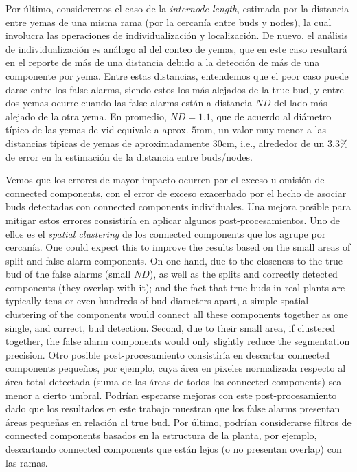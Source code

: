 \documentclass[a4paper,authoryear,review]{elsarticle}
\begin{document}
%
Por último, consideremos el caso de la \emph{internode length}, estimada por la distancia entre yemas de una misma rama (por la cercanía entre buds y nodes), la cual involucra las operaciones de individualización y localización. De nuevo, el análisis de individualización es análogo al del conteo de yemas, que en este caso resultará en el reporte de más de una distancia debido a la detección de más de una componente por yema. Entre estas distancias, entendemos que el peor caso puede darse entre los false alarms, siendo estos los más alejados de la true bud, y entre dos yemas ocurre cuando las false alarms están a distancia $ND$ del lado más alejado de la otra yema. En promedio, $ND = 1.1$, que de acuerdo al diámetro típico de las yemas de vid equivale a aprox. $5$mm, un valor muy menor a las distancias típicas de yemas de aproximadamente $30$cm, i.e., alrededor de un $3.3\%$ de error en la estimación de la distancia entre buds/nodes. 
%
%


Vemos que los errores de mayor impacto ocurren por el exceso u omisión de connected components, con el error de exceso exacerbado por el hecho de asociar buds detectadas con connected components individuales. 
%
Una mejora posible para mitigar estos errores consistiría en aplicar algunos post-procesamientos. 
%
Uno de ellos es el \emph{spatial clustering} de los connected components que los agrupe por cercanía. One could expect this to improve the results based on the small areas of split and false alarm components. On one hand, due to the closeness to the true bud of the false alarms (small $ND$), as well as the splits and  correctly detected components (they overlap with it);  and the fact that true buds in real plants are typically tens or even hundreds of bud diameters apart, a simple spatial clustering of the components would connect all these components together as one single, and correct, bud detection. Second, due to their small area, if clustered together, the false alarm components would only slightly reduce the segmentation precision.
%
Otro posible post-procesamiento consistiría en descartar connected components pequeños, por ejemplo, cuya área en pixeles normalizada respecto al área total detectada (suma de las áreas de todos los connected components) sea menor a cierto umbral. Podrían esperarse mejoras con este post-procesamiento dado que los resultados en este trabajo muestran que los false alarms presentan áreas pequeñas en relación al true bud.
% 
Por último, podrían considerarse filtros de connected components basados en la estructura de la planta, por ejemplo, descartando connected components que están lejos (o no presentan overlap) con las ramas.
\end{document}
